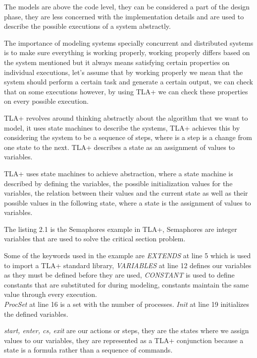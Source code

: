 \documentclass{thesul}
\begin{document}
The models are above the code level, they can be considered a part of the design phase, they are less concerned with the implementation details and are used to describe the possible executions of a system abstractly.

The importance of modeling systems specially concurrent and distributed systems is to make sure everything is working properly, working properly differs based on the system mentioned but it always means satisfying certain properties on individual executions, let's assume that by working properly we mean that the system should perform a certain task and generate a certain output, we can check that on some executions however, by using TLA+ we can check these properties on every possible execution.
 
TLA+ revolves around thinking abstractly about the algorithm that we want to model, it uses state machines to describe the systems, TLA+ achieves this by considering the system to be a sequence of steps, where is a step is a change from one state to the next. TLA+ describes a state as an assignment of values to variables.

TLA+ uses state machines to achieve abstraction, where a state machine is described by defining the variables, the possible initialization values for the variables, the relation between their values and the current state as well as their possible values in the following state, where a state is the assignment of values to variables.

The listing 2.1 is the Semaphores example in TLA+, Semaphores are integer variables that are used to solve the critical section problem.

Some of the keywords used in the example are \textit{EXTENDS} at line 5 which is used to import a TLA+ standard library,  \textit{VARIABLES} at line 12 defines our variables as they must be defined before they are used, \textit{CONSTANT} is used to define constants that are substituted for during modeling, constants maintain the same value through every execution.
\hfill\\

\textit{ProcSet} at line 16 is a set with the number of processes. \textit{Init} at line 19 initializes the defined variables.

\textit{start, enter, cs, exit} are our actions or steps, they are the states where we assign values to our variables, they are represented as a TLA+ conjunction because a state is a formula rather than a sequence of commands.
\end{document}

